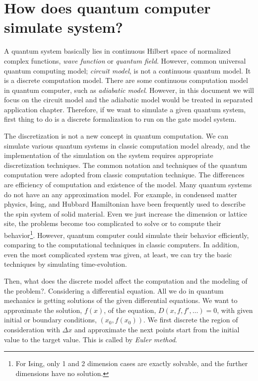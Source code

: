 \section{How does quantum computer simulate system?}

A quantum system basically lies in continuous Hilbert space of normalized complex functions, \textit{wave function} or \textit{quantum field}.
However, common universal quantum computing model; \textit{circuit model}, is not a continuous quantum model. 
It is a discrete computation model. There are some continuous computation model in quantum computer, such as \textit{adiabatic model}. 
However, in this document we will focus on the circuit model and the adiabatic model would be treated in separated application chapter.
Therefore, if we want to simulate a given quantum system, 
first thing to do is a discrete formalization to run on the gate model system.

The discretization is not a new concept in quantum computation. 
We can simulate various quantum systems in classic computation model already, 
and the implementation of the simulation on the system requires appropriate discretization techniques.
The common notation and techniques of the quantum computation were adopted from classic computation technique. 
The differences are efficiency of computation and existence of the model. 
Many quantum systems do not have an any approximation model.
For example, in condensed matter physics, 
Ising, and Hubbard Hamiltonian have been frequently used to describe the spin system of solid material.
Even we just increase the dimension or lattice site, the problems become too complicated to solve or to compute 
their behavior\footnote{For Ising, only 1 and 2 dimension cases are exactly solvable, and the further dimensions have no solution.}.
However, quantum computer could simulate their behavior efficiently, comparing to the computational techniques
in classic computers. 
In addition, even the most complicated system was given, at least, 
we can try the basic techniques by simulating time-evolution.

Then, what does the discrete model affect the computation and the modeling of the problem?.
Considering a differential equation. All we do in quantum mechanics is getting solutions of the given differential equations.
We want to approximate the solution, $f(x)$, of the equation, 
$D(x, f, f', \dots) = 0$, 
with given initial or boundary conditions, $(x_0, f(x_0))$.
We first discrete the region of consideration with $\Delta x$ and approximate 
the next points start from the initial value to the target value.
This is called by \textit{Euler method}. 

